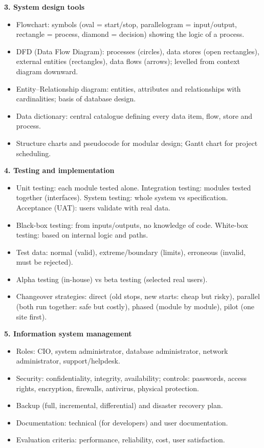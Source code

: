 \documentclass[11pt]{article}
\newcommand{\cle}[1]{{\popxbold\color{popdark}#1}}
\begin{document}
\begin{bilan}
\textbf{3. System design tools}
\begin{itemize}
\item \cle{Flowchart}: symbols (oval = start/stop, parallelogram = input/output, rectangle = process, diamond = decision) showing the logic of a process.
\item \cle{DFD} (Data Flow Diagram): processes (circles), data stores (open rectangles), external entities (rectangles), data flows (arrows); levelled from context diagram downward.
\item \cle{Entity--Relationship diagram}: entities, attributes and relationships with cardinalities; basis of database design.
\item \cle{Data dictionary}: central catalogue defining every data item, flow, store and process.
\item \cle{Structure charts} and \cle{pseudocode} for modular design; \cle{Gantt chart} for project scheduling.
\end{itemize}

\textbf{4. Testing and implementation}
\begin{itemize}
\item \cle{Unit testing}: each module tested alone. \cle{Integration testing}: modules tested together (interfaces). \cle{System testing}: whole system vs specification. \cle{Acceptance (UAT)}: users validate with real data.
\item \cle{Black-box testing}: from inputs/outputs, no knowledge of code. \cle{White-box testing}: based on internal logic and paths.
\item Test data: \cle{normal} (valid), \cle{extreme/boundary} (limits), \cle{erroneous} (invalid, must be rejected).
\item \cle{Alpha testing} (in-house) vs \cle{beta testing} (selected real users).
\item Changeover strategies: \cle{direct} (old stops, new starts: cheap but risky), \cle{parallel} (both run together: safe but costly), \cle{phased} (module by module), \cle{pilot} (one site first).
\end{itemize}

\textbf{5. Information system management}
\begin{itemize}
\item Roles: \cle{CIO}, system administrator, database administrator, network administrator, support/helpdesk.
\item \cle{Security}: confidentiality, integrity, availability; controls: passwords, access rights, encryption, firewalls, antivirus, physical protection.
\item \cle{Backup} (full, incremental, differential) and \cle{disaster recovery plan}.
\item Documentation: \cle{technical} (for developers) and \cle{user} documentation.
\item Evaluation criteria: performance, reliability, cost, user satisfaction.
\end{itemize}


\end{bilan}
\end{document}
